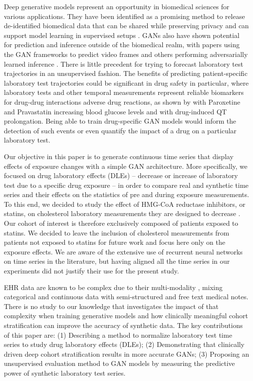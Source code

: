 \documentclass{article}
\begin{document}
Deep generative models represent an opportunity in biomedical sciences for various applications. They have been identified as a promising method to release de-identified biomedical data that can be shared while preserving privacy \cite{beaulieu2017privacy, choi2017generating} and can support model learning in supervised setups \cite{esteban2017real}. GANs also have shown potential for prediction and inference outside of the biomedical realm, with papers using the GAN frameworks to predict video frames \cite{mathieu2015deep} and others performing adversarially learned inference \cite{dumoulin2016adversarially}. There is little precedent for trying to forecast laboratory test trajectories in an unsupervised fashion. The benefits of predicting patient-specific laboratory test trajectories could be significant in drug safety in particular, where laboratory tests and other temporal measurements represent reliable biomarkers for drug-drug interactions adverse drug reactions, as shown by \citet{tatonetti2011detecting} with Paroxetine and Pravastatin increasing blood glucose levels and \citet{lorberbaum2016coupling} with drug-induced QT prolongation. Being able to train drug-specific GAN models would inform the detection of such events or even quantify the impact of a drug on a particular laboratory test.

Our objective in this paper is to generate continuous time series that display effects of exposure changes with a simple GAN architecture. More specifically, we focused on drug laboratory effects (DLEs) -- decrease or increase of laboratory test due to a specific drug exposure -- in order to compare real and synthetic time series and their effects on the statistics of pre and during exposure measurements. To this end, we decided to study the effect of HMG-CoA reductase inhibitors, or statins, on cholesterol laboratory measurements they are designed to decrease \cite{istvan2001structural}. Our cohort of interest is therefore exclusively composed of patients exposed to statins. We decided to leave the inclusion of cholesterol measurements from patients not exposed to statins for future work and focus here only on the exposure effects. We are aware of the extensive use of recurrent neural networks on time series in the literature, but having aligned all the time series in our experiments did not justify their use for the present study.

EHR data are known to be complex due to their multi-modality \cite{hripcsak2012next}, mixing categorical and continuous data with semi-structured and free text medical notes. There is no study to our knowledge that investigates the impact of that complexity when training generative models and how clinically meaningful cohort stratification can improve the accuracy of synthetic data. The key contributions of this paper are: (1) Describing a method to normalize laboratory test time series to study drug laboratory effects (DLEs); (2) Demonstrating that clinically driven deep cohort stratification results in more accurate GANs; (3) Proposing an unsupervised evaluation method to GAN models by measuring the predictive power of synthetic laboratory test series.
\end{document}
